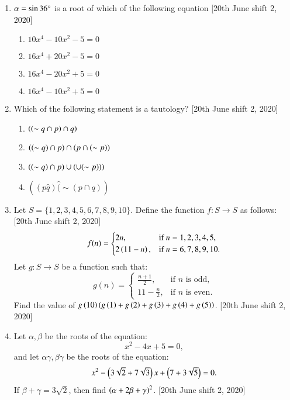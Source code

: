 \documentclass[journal,12pt,twocolumn]{IEEEtran}
\theoremstyle{remark}
\begin{document}
\begin{enumerate}
    \item $\alpha = \sin 36\degree$ is a root of which of the following equation \hfill{[20th June shift 2, 2020]}
    \begin{multicols}{2}
    \begin{enumerate}
        \item $10x^4 - 10x^2 -5 = 0$
        \item $16x^4 + 20x^2 -5 = 0$
        \item $16x^4 - 20x^2 +5 = 0$
        \item $16x^4 - 10x^2 +5 = 0$
    \end{enumerate}
    \end{multicols}

    \item Which of the following statement is a tautology?  \hfill{[20th June shift 2, 2020]}
    \begin{multicols}{2}
    \begin{enumerate}
        \item $\left(\left(\sim q \cap p\right)\cap q\right) $
        \item $\left(\left(\sim q\right) \cap p\right) \cap \left(p \cap \left(\sim p\right)\right)$
        \item $\left(\left(\sim q\right) \cap p\right) \cup \left( \cup (\sim p))\right)$
        \item $((p \hat q) \hat (\sim(p \cap q))$
    \end{enumerate}
    \end{multicols}

    
    \item Let $ S = \{1, 2, 3, 4, 5, 6, 7, 8, 9, 10\} $. Define the function $ f: S \to S $ as follows:  \hfill{[20th June shift 2, 2020]}
    \[
    f(n) = 
    \begin{cases}
    2n, & \text{if } n = 1, 2, 3, 4, 5, \\
    2\left(11 - n\right), & \text{if } n = 6, 7, 8, 9, 10.
    \end{cases}
    \]
    Let $ g: S \to S $ be a function such that:
    \[
    g(n) =
    \begin{cases}
    \frac{n+1}{2}, & \text{if } n \text{ is odd}, \\
    11 - \frac{n}{2}, & \text{if } n \text{ is even}.
    \end{cases}
    \]
    Find the value of $ g\left(10\right) \left( g\left(1\right) + g\left(2\right) + g\left(3\right) + g\left(4\right) + g\left(5\right) \right) $.  \hfill{[20th June shift 2, 2020]}

    \item Let $ \alpha, \beta $ be the roots of the equation: 
    \[
    x^2 - 4x + 5 = 0,
    \]
    and let $ \alpha \gamma, \beta \gamma $ be the roots of the equation:
    \[
    x^2 - \left(3\sqrt{2} + 7\sqrt{3}\right)x + \left(7 + 3\sqrt{5}\right) = 0.
    \]
    If $ \beta + \gamma = 3\sqrt{2} $, then find $ \left(\alpha + 2\beta + \gamma\right)^2 $. \hfill{[20th June shift 2, 2020]}


\end{enumerate}
\end{document}

